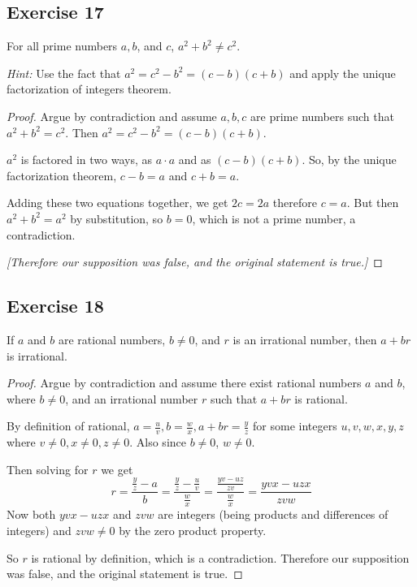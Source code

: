 \documentclass[14pt]{extarticle}
\begin{document}
\subsection{Exercise 17}
For all prime numbers $a, b$, and $c$, $a^2 + b^2 \neq c^2$.

{\it Hint:} Use the fact that $a^2 = c^2 - b^2 = (c - b)(c + b)$ and apply the unique factorization of integers theorem.

\begin{proof}
Argue by contradiction and assume $a,b,c$ are prime numbers such that $a^2 + b^2 = c^2$. Then $a^2 = c^2 - b^2 = (c - b)(c + b)$. 

$a^2$ is factored in two ways, as $a \cdot a$ and as $(c-b)(c+b)$. So, by the unique factorization theorem, $c-b = a$ and $c+b = a$. 

Adding these two equations together, we get $2c = 2a$ therefore $c = a$. But then $a^2 + b^2 = a^2$ by substitution, so $b=0$, which is not a prime number, a contradiction.

{\it [Therefore our supposition was false, and the original statement is true.]}
\end{proof}

\subsection{Exercise 18}
If $a$ and $b$ are rational numbers, $b \neq 0$, and $r$ is an irrational number, then $a + br$ is irrational.

\begin{proof}
Argue by contradiction and assume there exist rational numbers $a$ and $b$, where $b \neq 0$, and an irrational number $r$ such that $a + br$ is rational.

By definition of rational, $a = \frac{u}{v}, b = \frac{w}{x}, a+br = \frac{y}{z}$ for some integers $u,v,w,x,y,z$ where $v \neq 0, x \neq 0, z \neq 0$. Also since $b \neq 0$, $w \neq 0$.

Then solving for $r$ we get
\[
r = \frac{\frac{y}{z}-a}{b} = \frac{\frac{y}{z}-\frac{u}{v}}{\frac{w}{x}} = \frac{\frac{yv-uz}{zv}}{\frac{w}{x}} = \frac{yvx-uzx}{zvw}
\]
Now both $yvx-uzx$ and $zvw$ are integers (being products and differences of integers) and $zvw \neq 0$ by the zero product property.

So $r$ is rational by definition, which is a contradiction. Therefore our supposition was false, and the original statement is true.
\end{proof}
\end{document}
